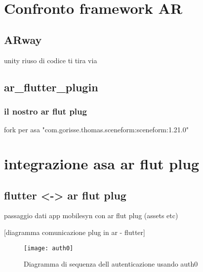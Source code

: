 \section{Confronto framework AR}
\label{sec:scelta-framework-flutter}
\subsection{ARway}
unity 
riuso di codice
ti tira via

\subsection{ar\_flutter\_plugin}
\subsubsection{il nostro ar flut plug}
fork per asa 
"com.gorisse.thomas.sceneform:sceneform:1.21.0" 

\section{integrazione asa ar flut plug}
\label{sec:progettazione-onboarding-primo-login}


\subsection{flutter <-> ar flut plug}
\label{sec:autenticazione-tramite-auth0}
passaggio dati app mobilesyn con ar flut plug (assets etc)

[diagramma comunicazione plug in ar - flutter]


\begin{figure}[h!]
    \centering
    \texttt{[image: auth0]}
    \caption{Diagramma di sequenza dell autenticazione usando auth0}
\end{figure}
